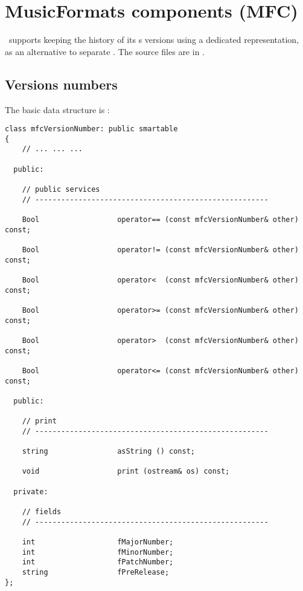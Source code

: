
\chapter{MusicFormats components (MFC)}\label{MusicFormats components (MFC)}

\mf\ supports keeping the history of its \component s versions using a dedicated representation, as an alternative to separate . The source files are in \mfc.


\section{Versions numbers}\label{Versions numbers}

The basic data structure is :
\begin{lstlisting}[language=CPlusPlus]
class mfcVersionNumber: public smartable
{
	// ... ... ...

  public:

    // public services
    // ------------------------------------------------------

    Bool                  operator== (const mfcVersionNumber& other) const;

    Bool                  operator!= (const mfcVersionNumber& other) const;

    Bool                  operator<  (const mfcVersionNumber& other) const;

    Bool                  operator>= (const mfcVersionNumber& other) const;

    Bool                  operator>  (const mfcVersionNumber& other) const;

    Bool                  operator<= (const mfcVersionNumber& other) const;

  public:

    // print
    // ------------------------------------------------------

    string                asString () const;

    void                  print (ostream& os) const;

  private:

    // fields
    // ------------------------------------------------------

    int                   fMajorNumber;
    int                   fMinorNumber;
    int                   fPatchNumber;
    string                fPreRelease;
};
\end{lstlisting}


